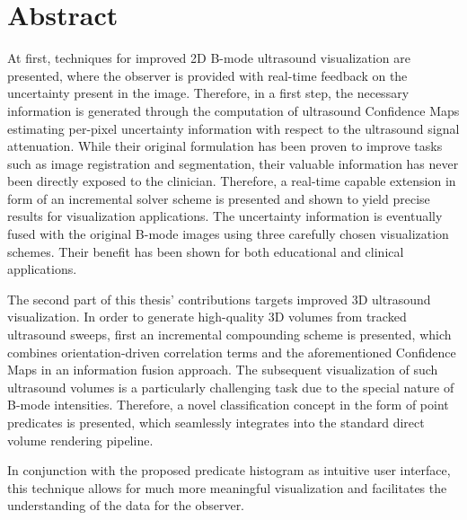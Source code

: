 %
\chapter*{Abstract}
\label{sec:abstract}



At first, techniques for improved 2D B-mode ultrasound visualization are presented, where the observer is provided with real-time feedback on the uncertainty present in the image.
Therefore, in a first step, the necessary information is generated through the computation of ultrasound Confidence Maps estimating per-pixel uncertainty information with respect to the ultrasound signal attenuation.
While their original formulation has been proven to improve tasks such as image registration and segmentation, their valuable information has never been directly exposed to the clinician.
Therefore, a real-time capable extension in form of an incremental solver scheme is presented and shown to yield precise results for visualization applications.
The uncertainty information is eventually fused with the original B-mode images using three carefully chosen visualization schemes.
Their benefit has been shown for both educational and clinical applications.


The second part of this thesis' contributions targets improved 3D ultrasound visualization.
In order to generate high-quality 3D volumes from tracked ultrasound sweeps, first an incremental compounding scheme is presented, which combines orientation-driven correlation terms and the aforementioned Confidence Maps in an information fusion approach.
The subsequent visualization of such ultrasound volumes is a particularly challenging task due to the special nature of B-mode intensities.
Therefore, a novel classification concept in the form of point predicates is presented, which seamlessly integrates into the standard direct volume rendering pipeline.

In conjunction with the proposed predicate histogram as intuitive user interface, this technique allows for much more meaningful visualization and facilitates the understanding of the data for the observer.

%
%
